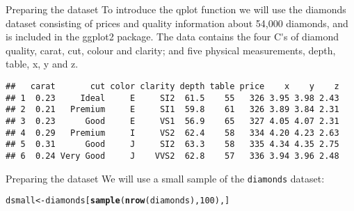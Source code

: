 \documentclass{beamer}\usepackage[]{graphicx}\usepackage[]{color}
\makeatletter
\newcommand{\hlnum}[1]{\textcolor[rgb]{0.686,0.059,0.569}{#1}}%
\newcommand{\hlstd}[1]{\textcolor[rgb]{0.345,0.345,0.345}{#1}}%
\newcommand{\hlkwb}[1]{\textcolor[rgb]{0.69,0.353,0.396}{#1}}%
\newcommand{\hlkwd}[1]{\textcolor[rgb]{0.737,0.353,0.396}{\textbf{#1}}}%
\newenvironment{kframe}{%
 \def\at@end@of@kframe{}%
 \ifinner\ifhmode%
  \def\at@end@of@kframe{\end{minipage}}%
  \begin{minipage}{\columnwidth}%
 \fi\fi%
 \def\FrameCommand##1{\hskip\@totalleftmargin \hskip-\fboxsep
 \colorbox{shadecolor}{##1}\hskip-\fboxsep
     \hskip-\linewidth \hskip-\@totalleftmargin \hskip\columnwidth}%
 \MakeFramed {\advance\hsize-\width
   \@totalleftmargin\z@ \linewidth\hsize
   \@setminipage}}%
 {\par\unskip\endMakeFramed%
 \at@end@of@kframe}
\newenvironment{knitrout}{}{} %
\makeatother
\begin{document}
\begin{frame}[containsverbatim]{Preparing the dataset}
To introduce the qplot function we will use the diamonds dataset consisting of prices and quality information about 54,000 diamonds, and is included in the ggplot2 package. The data contains the four C\'{}s of diamond quality, carat, cut, colour and clarity; and five physical measurements, depth, table, x, y and z.
\begin{knitrout}\footnotesize
{}\color{fgcolor}\begin{kframe}


{\ttfamily\noindent\itshape\color{messagecolor}{\#\# Loading required package: methods}}\end{kframe}
\end{knitrout}
\begin{knitrout}\footnotesize
{}\color{fgcolor}\begin{kframe}
\begin{verbatim}
##   carat       cut color clarity depth table price    x    y    z
## 1  0.23     Ideal     E     SI2  61.5    55   326 3.95 3.98 2.43
## 2  0.21   Premium     E     SI1  59.8    61   326 3.89 3.84 2.31
## 3  0.23      Good     E     VS1  56.9    65   327 4.05 4.07 2.31
## 4  0.29   Premium     I     VS2  62.4    58   334 4.20 4.23 2.63
## 5  0.31      Good     J     SI2  63.3    58   335 4.34 4.35 2.75
## 6  0.24 Very Good     J    VVS2  62.8    57   336 3.94 3.96 2.48
\end{verbatim}
\end{kframe}
\end{knitrout}
\end{frame}

\begin{frame}[containsverbatim]{Preparing the dataset}
We will use a small sample of the \texttt{diamonds} dataset:
\begin{knitrout}\footnotesize
{}\color{fgcolor}\begin{kframe}
\begin{alltt}
\hlstd{dsmall} \hlkwb{<-} \hlstd{diamonds[}\hlkwd{sample}\hlstd{(}\hlkwd{nrow}\hlstd{(diamonds),} \hlnum{100}\hlstd{), ]}
\end{alltt}
\end{kframe}
\end{knitrout}
\end{frame}
\end{document}
